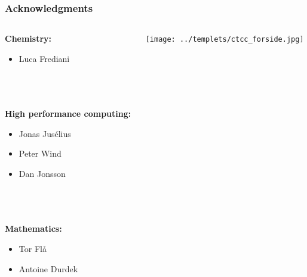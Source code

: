 \begin{frame}
    \frametitle{Acknowledgments}
    \large
    \begin{columns}
    \begin{column}[b]{0.5\linewidth}
    \textbf{Chemistry:}
    \begin{itemize}
	\item Luca Frediani
    \end{itemize}
    \ \\
    \ \\
    \ \\
    \textbf{High performance computing:}
    \begin{itemize}
    	\item Jonas Jus\'{e}lius
    	\item Peter Wind
    	\item Dan Jonsson
    \end{itemize}
    \ \\
    \ \\
    \ \\
    \textbf{Mathematics:}
    \begin{itemize}
	\item Tor Fl\aa
	\item Antoine Durdek
    \end{itemize}
    \end{column}
    \begin{column}[b]{0.5\linewidth}
	\centering
	\texttt{[image: ../templets/ctcc\_forside.jpg]}\\
	\ \\
	\ \\

\end{column}
\end{columns}
\end{frame}
